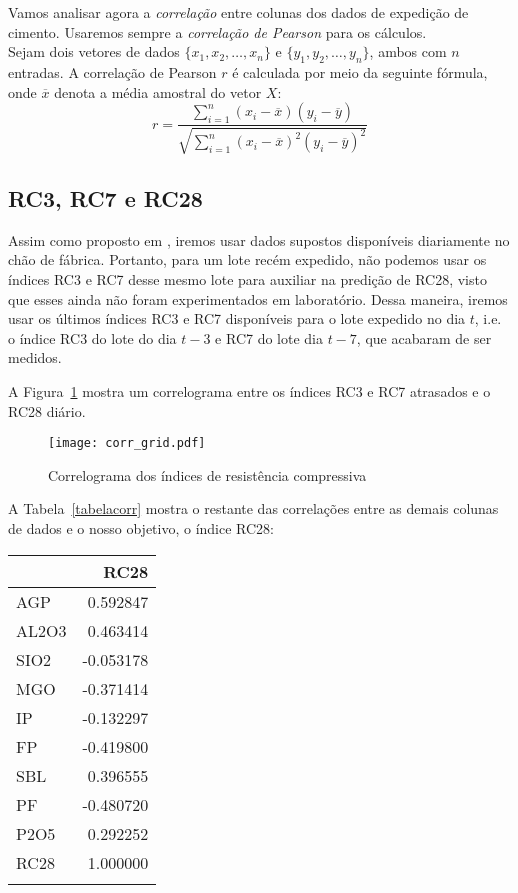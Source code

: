 Vamos analisar agora a \textit{correlação} entre colunas dos dados de expedição
de cimento. Usaremos sempre a \textit{correlação de Pearson} para os cálculos.
\\
Sejam dois vetores de
dados $\{x_1,x_2, \dots , x_n\}$ e $\{y_1,y_2, \dots , y_n\}$, ambos com $n$ entradas. A correlação de Pearson $r$ é calculada
por meio da seguinte fórmula, onde $\overline{x}$ denota a média amostral do
vetor $X$: \\



\[ r = \frac{{}\sum_{i=1}^{n} (x_i - \overline{x})(y_i - \overline{y})}
{\sqrt{\sum_{i=1}^{n} (x_i - \overline{x})^2(y_i - \overline{y})^2}} \] 


\bigskip

\subsection{RC3, RC7 e RC28}

Assim como proposto em \cite{grecialin}, iremos usar dados supostos disponíveis diariamente no chão de fábrica. Portanto, para um lote recém expedido,
não podemos usar os índices RC3 e RC7 desse mesmo lote para auxiliar na predição
de RC28, visto que esses ainda não foram experimentados em laboratório. Dessa maneira, iremos usar os últimos índices RC3 e RC7 disponíveis para o lote expedido no dia $t$,
i.e. o índice RC3 do lote do dia $t-3$ e RC7 do lote dia $t-7$, que acabaram de ser medidos. 

A Figura~\ref{fig:gridcorr} mostra um correlograma entre os índices RC3 e RC7
atrasados e o RC28 diário. 

\begin{figure}[H]
  \centering
  \texttt{[image: corr\_grid.pdf]}
  \caption{Correlograma dos índices de resistência compressiva}
  \label{fig:gridcorr}
\end{figure}

A Tabela~\ref{tabelacorr} mostra o restante das correlações entre as demais
colunas de dados e o nosso objetivo, o índice RC28:

\begin{tabular}{lr}
  \toprule
  {} &      RC28 \\
  \midrule
  AGP   &  0.592847 \\
  AL2O3 &  0.463414 \\
  SIO2  & -0.053178 \\
  MGO   & -0.371414 \\
  IP    & -0.132297 \\
  FP    & -0.419800 \\
  SBL   &  0.396555 \\
  PF    & -0.480720 \\
  P2O5  &  0.292252 \\
  RC28  &  1.000000 \\
  \bottomrule
  \label{tabelacorr}
\end{tabular}







